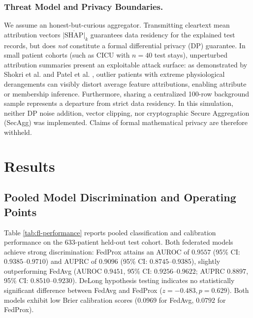 \documentclass[sigconf,review,anonymous]{acmart}
\begin{document}
\subsubsection{Threat Model and Privacy Boundaries.}
We assume an honest-but-curious aggregator. Transmitting cleartext mean attribution vectors $\overline{|\text{SHAP}|}_k$ guarantees data residency for the explained test records, but does \emph{not} constitute a formal differential privacy (DP) guarantee. In small patient cohorts (such as CICU with $n=40$ test stays), unperturbed attribution summaries present an exploitable attack surface: as demonstrated by Shokri et al. \cite{shokri2021privacy} and Patel et al. \cite{patel2022model}, outlier patients with extreme physiological derangements can visibly distort average feature attributions, enabling attribute or membership inference. Furthermore, sharing a centralized 100-row background sample represents a departure from strict data residency. In this simulation, neither DP noise addition, vector clipping, nor cryptographic Secure Aggregation (SecAgg) \cite{bonawitz2017practical} was implemented. Claims of formal mathematical privacy are therefore withheld.

\section{Results}\label{sec:results}

\subsection{Pooled Model Discrimination and Operating Points}
Table \ref{tab:fl-performance} reports pooled classification and calibration performance on the 633-patient held-out test cohort. Both federated models achieve strong discrimination: FedProx attains an AUROC of $0.9557$ (95\% CI: $0.9385$--$0.9710$) and AUPRC of $0.9096$ (95\% CI: $0.8745$--$0.9385$), slightly outperforming FedAvg (AUROC $0.9451$, 95\% CI: $0.9256$--$0.9622$; AUPRC $0.8897$, 95\% CI: $0.8510$--$0.9230$). DeLong hypothesis testing indicates no statistically significant difference between FedAvg and FedProx ($z = -0.483, p = 0.629$). Both models exhibit low Brier calibration scores ($0.0969$ for FedAvg, $0.0792$ for FedProx).
\end{document}
